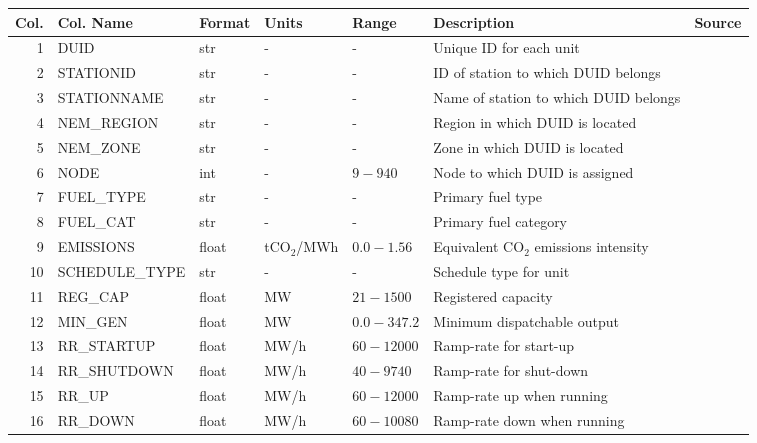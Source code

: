 \begin{table}[H]
\begin{threeparttable}
\centering
\small\begin{tabular}{rllllll}
\toprule
 Col. &                     Col. Name & Format &          Units &        Range &                                                        Description &                 Source\tnote{$\dagger$} \\
\midrule
 1 &  DUID &  str &  - &  - &  Unique ID for each unit &  \cite{aemo_data_2018} \\
 2 &  STATIONID &  str &  - &  - &  ID of station to which DUID belongs &  \cite{aemo_data_2018} \\
 3 &  STATIONNAME &  str &  - &  - &  Name of station to which DUID belongs &  \cite{aemo_data_2018} \\
 4 &  NEM\_REGION &  str &  - &  - &  Region in which DUID is located &   \\
 5 &  NEM\_ZONE &  str &  - &  - &  Zone in which DUID is located &   \\
 6 &  NODE &  int &  - &  $9-940$ &  Node to which DUID is assigned &   \\
 7 &  FUEL\_TYPE &  str &  - &  - &  Primary fuel type &  \cite{aemo_data_2018} \\
 8 &  FUEL\_CAT &  str &  - &  - &  Primary fuel category &   \\
 9 &  EMISSIONS &  float &  tCO$_{2}$/MWh &  $0.0-1.56$ &  Equivalent CO$_{2}$ emissions intensity &  \cite{aemo_current_2018} \\
 10 &  SCHEDULE\_TYPE &  str &  - &  - &  Schedule type for unit &  \cite{aemo_data_2018} \\
 11 &  REG\_CAP &  float &  MW &  $21-1500$ &  Registered capacity &  \cite{aemo_data_2018} \\
 12 &  MIN\_GEN &  float &  MW &  $0.0-347.2$ &  Minimum dispatchable output &  \cite{aemo_data_2018, aemo_ntndp_2018} \\
 13 &  RR\_STARTUP &  float &  MW/h &  $60-12000$ &  Ramp-rate for start-up &  \cite{aemo_ntndp_2018} \\
 14 &  RR\_SHUTDOWN &  float &  MW/h &  $40-9740$ &  Ramp-rate for shut-down &  \cite{aemo_ntndp_2018} \\
 15 &  RR\_UP &  float &  MW/h &  $60-12000$ &  Ramp-rate up when running &  \cite{aemo_ntndp_2018} \\
 16 &  RR\_DOWN &  float &  MW/h &  $60-10080$ &  Ramp-rate down when running &  \cite{aemo_ntndp_2018} \\

\end{tabular}
\end{threeparttable}
\end{table}
